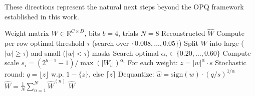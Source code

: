 These directions represent the natural next steps beyond the OPQ
framework established in this work.

\begin{algorithm}[h]
\caption{ROQ Final: OPQ + DT + Per-ch + Stochastic}
\label{alg:roq_final}
\begin{algorithmic}[1]
\REQUIRE Weight matrix $W \in \mathbb{R}^{C \times D}$, bits $b=4$, trials $N=8$
\ENSURE Reconstructed $\hat{W}$
\STATE Compute per-row optimal threshold $\tau$ (search over $\{0.008, \ldots, 0.05\}$)
\STATE Split $W$ into large ($|w| \geq \tau$) and small ($|w| < \tau$) masks
    \STATE Search optimal $\alpha_i \in \{0.20, \ldots, 0.60\}$
    \STATE Compute scale $s_i = (2^{b-1}-1) / \max(|W_i|)^{\alpha_i}$
\ENDFOR
{}
    \STATE For each weight: $z = |w|^{\alpha} \cdot s$
    \STATE Stochastic round: $q = \lfloor z \rfloor$ w.p. $1-\{z\}$, else $\lceil z \rceil$
    \STATE Dequantize: $\hat{w} = \text{sign}(w) \cdot (q/s)^{1/\alpha}$
\ENDFOR
\STATE $\hat{W} = \frac{1}{N} \sum_{n=1}^{N} \hat{W}^{(n)}$
\RETURN $\hat{W}$
\end{algorithmic}
\end{algorithm}

